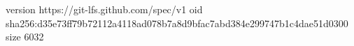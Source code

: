 version https://git-lfs.github.com/spec/v1
oid sha256:d35e73ff79b72112a4118ad078b7a8d9bfac7abd384e299747b1c4dae51d0300
size 6032
